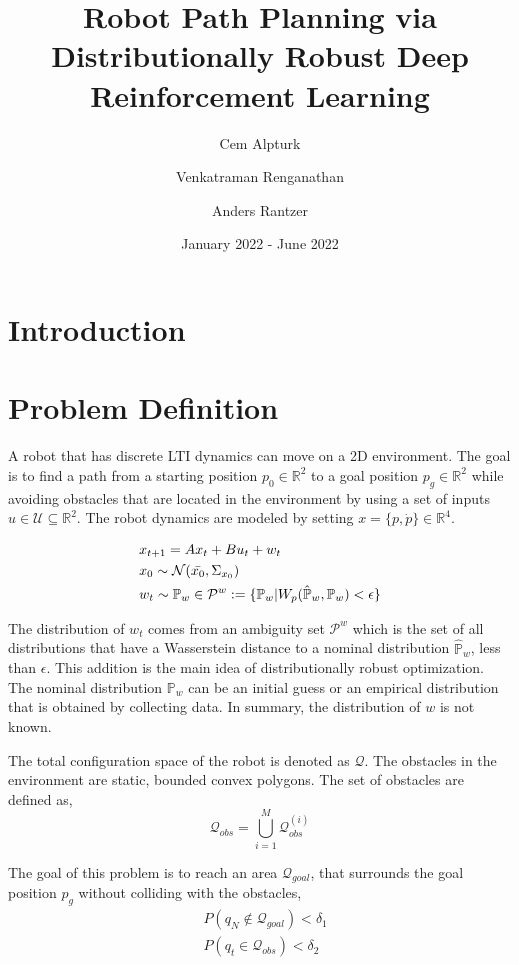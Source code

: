 \documentclass{article}
\title{Robot Path Planning via Distributionally Robust Deep Reinforcement Learning}
\author[1]{Cem Alpturk}
\author[2]{Venkatraman Renganathan}
\author[3]{Anders Rantzer}
\affil[1]{Student: \texttt{ce5368al-s@student.lu.se}}
\affil[2]{Supervisor: \texttt{venkat@control.lth.se}}
\affil[2]{Examiner: \texttt{anders.rantzer@control.lth.se}}
\date{January 2022 - June 2022}
\begin{document}
\maketitle

\section{Introduction}

\section{Problem Definition}
A robot that has discrete LTI dynamics can move on a 2D environment. The goal is to find a path from a starting position $p_0 \in \mathbb{R}^2 $ to a goal position $p_g \in \mathbb{R}^2$ while avoiding obstacles that are located in the environment by using a set of inputs $u \in \mathcal{U} \subseteq \mathbb{R}^2$. The robot dynamics are modeled by setting $x = \{p,\dot{p}\} \in \mathbb{R}^4$.

\begin{equation}
    \begin{split}
        &x_{t+1} = Ax_t + Bu_t + w_t \\
        &x_0 \sim \mathcal{N}(\Bar{x_0}, \Sigma_{x_0}) \\
        &w_t \sim \mathbb{P}_w \in \mathcal{P}^w := \{\mathbb{P}_w | W_p(\hat{\mathbb{P}}_w,\mathbb{P}_w) < \epsilon \}
    \end{split}
\end{equation}

The distribution of $w_t$ comes from an ambiguity set $\mathcal{P}^w$ which is the set of all distributions that have a Wasserstein distance to a nominal distribution $\hat{\mathbb{P}}_w$, less than $\epsilon$. This addition is the main idea of distributionally robust optimization. The nominal distribution $\mathbb{P}_w$ can be an initial guess or an empirical distribution that is obtained by collecting data. In summary, the distribution of $w$ is not known.

The total configuration space of the robot is denoted as $\mathcal{Q}$. The obstacles in the environment are static, bounded convex polygons. The set of obstacles are defined as,
\begin{equation}
    \mathcal{Q}_{obs} = \bigcup \limits_{i=1}^M \mathcal{Q}_{obs}^{(i)}
\end{equation}

The goal of this problem is to reach an area $\mathcal{Q}_{goal}$, that surrounds the goal position $p_g$ without colliding with the obstacles,
\begin{equation}
    \begin{split}
        &P(q_N \notin \mathcal{Q}_{goal}) < \delta_1 \\
        &P(q_t \in \mathcal{Q}_{obs}) < \delta_2
    \end{split}
\end{equation}
\end{document}
